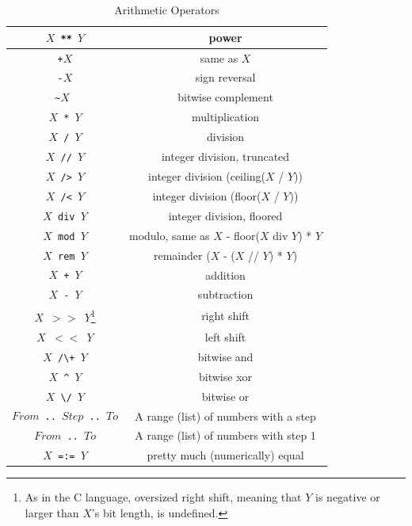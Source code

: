 \begin{table}
\caption{\label{tab:arithdef}Arithmetic Operators}
\begin{center}
\begin{tabular}{ |c|c| } \hline
 \texttt{$X$ ** $Y$}  &  power \\ \hline 
 \texttt{+$X$}      &  same as $X$ \\ \hline
 \texttt{-$X$}      &  sign reversal \\ \hline 
 {\tt \verb+~+$X$ }  &   bitwise complement \\ \hline 
 \texttt{$X$ * $Y$} &    multiplication \\ \hline 
 \texttt{$X$ / $Y$} &    division \\ \hline 
 \texttt{$X$ // $Y$} &    integer division, truncated \\ \hline 
 \texttt{$X$ /> $Y$}  &  integer division (ceiling($X$ / $Y$)) \\ \hline
 \texttt{$X$ /< $Y$}  &  integer division (floor($X$ / $Y$)) \\ \hline
 \texttt{$X$ div $Y$} &   integer division, floored \\ \hline
 \texttt{$X$ mod $Y$} &   modulo, same as $X$ - floor($X$ div $Y$) * $Y$ \\ \hline 
 \texttt{$X$ rem $Y$} &  remainder ($X$ - ($X$ // $Y$) * $Y$) \\ \hline 
 \texttt{$X$ + $Y$} & addition \\ \hline 
 \texttt{$X$ - $Y$} &   subtraction \\ \hline 
 \texttt{$X$ $>$$>$ $Y$}\footnote{As in the C language, oversized right shift, meaning that $Y$ is negative or larger than $X$'s bit length, is undefined.}   &  right shift \\ \hline 
 \texttt{$X$ $<$$<$ $Y$}  &  left shift \\ \hline 
 {\tt $X$ \verb+/\+ $Y$}  &   bitwise and \\ \hline 
 {\tt $X$ \verb+^+ $Y$} &   bitwise xor \\ \hline
 {\tt $X$ \verb+\/+ $Y$}  &   bitwise or \\ \hline 
 {\tt $From$ \verb+..+ $Step$ \verb+..+ $To$}  &   A range (list) of numbers with a step \\ \hline 
 {\tt $From$ \verb+..+ $To$}  &   A range (list) of numbers with step 1 \\ \hline
 {\tt $X$ \verb+=:=+ $Y$}  &   pretty much (numerically) equal \\ \hline
\end{tabular}
\end{center}
\end{table}

